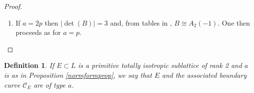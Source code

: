 \documentclass[11pt]{article}
\newtheorem{defn}[thm]{Definition}
\newcommand{\cc}{\mathcal{C}}
\newcommand{\opn}{\operatorname}
\newcommand{\beq}{\begin{equation*}}
\newcommand{\eeq}{\end{equation*}}
\newcommand{\bpm}{\begin{pmatrix}}
\newcommand{\epm}{\end{pmatrix}}
\begin{document}
\begin{proof}
\begin{enumerate}
          Similarly, if $B = - \bpm 4 & 2 \\ 2 & 4 \epm$ then
          \beq
          {}^{\intercal}SA + BT + C =
          \bpm
          as_{21} - 4 t_{11} - 2t_{21} + c_{11} &
          s_{11} - 4t_{12} -2t_{22} + c_{12} \\
          a s_{22} - 2 t_{11} - 4t_{21} + c_{21} &
          s_{12} - 2t_{12} -4t_{22} + c_{22}
          \epm
          \eeq
          and the same conclusion follows.
          In either case, we put $D$ in the required form by applying an appropriate base change  \eqref{Dtrans}.
        \item If $a=2p$ then $\vert \opn{det}(B) \vert = 3$ and, from tables in \cite{SPLAG}, $B \cong A_2(-1)$.
          One then proceeds as for $a=p$.
    \end{enumerate}
  \end{proof}
  \begin{defn}
    If $E \subset L$ is a primitive totally isotropic sublattice of rank 2 and $a$ is as in Proposition \ref{normformprop}, we say that $E$ and the associated boundary curve $\cc_E$ are of type $a$.
  \end{defn}
\end{document}
